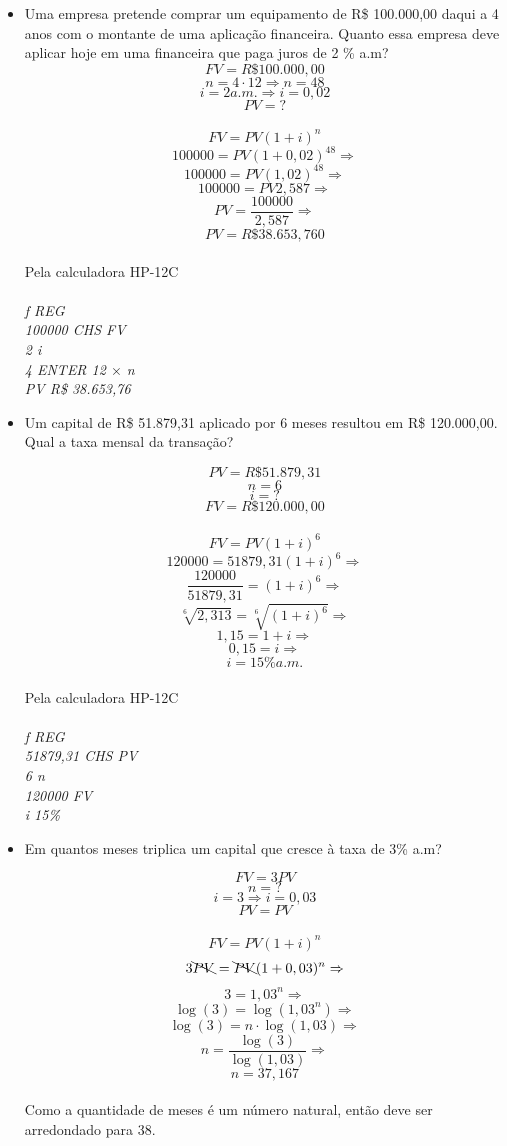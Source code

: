 \documentclass[a4paper, 12pt]{article}
\begin{document}
\begin{itemize}

\item Uma empresa pretende comprar um equipamento de R\$ 100.000,00 daqui
a 4 anos com o montante de uma aplicação financeira. Quanto essa empresa
deve aplicar hoje em uma financeira que paga juros de 2 \% a.m?
$$ FV = R\$100.000,00 $$
$$ n = 4 \cdot 12 \Rightarrow n = 48 $$
$$ i = 2 a.m. \Rightarrow i = 0,02 $$
$$ PV = ? $$
\\
$$ FV = PV(1+i)^n $$
$$ 100000 = PV(1+0,02)^{48} \Rightarrow $$
$$ 100000 = PV(1,02)^{48}  \Rightarrow $$
$$ 100000 = PV2,587  \Rightarrow $$
$$ PV = \frac{100000}{2,587}  \Rightarrow $$
$$ \boxed{PV = R\$38.653,760} $$
\\
Pela calculadora HP-12C\\\\
\emph{f REG}\\
\emph{100000 CHS FV}\\
\emph{2 i}\\
\emph{4 ENTER 12 $ \times$ n}\\
\emph{PV R\$ 38.653,76}

\item Um  capital  de  R\$  51.879,31  aplicado  por  6  meses  resultou  em  R\$ 120.000,00. Qual a taxa mensal da transação?
  
$$ PV = R\$51.879,31 $$
$$ n = 6 $$
$$ i = ? $$
$$ FV = R\$120.000,00 $$
\\
$$ FV = PV(1+i)^6 $$
$$ 120000 = 51879,31(1+i)^6 \Rightarrow $$
$$ \frac{120000}{51879,31} = (1+i)^6 \Rightarrow $$
$$ \sqrt[6]{2,313} = \sqrt[6]{(1+i)^6} \Rightarrow $$
$$ 1,15 = 1+i \Rightarrow $$
$$ 0,15 = i \Rightarrow $$
$$ \boxed{i = 15\% a.m.} $$
\\

Pela calculadora HP-12C\\\\
\emph{f REG}\\
\emph{51879,31 CHS PV}\\
\emph{6 n}\\
\emph{120000 FV}\\
\emph{i 15\%}
  
\item Em quantos meses triplica um capital que cresce à taxa de 3\% a.m?

$$ FV = 3PV $$
$$ n = ? $$
$$ i = 3 \Rightarrow i = 0,03 $$
$$ PV = PV $$
\\
$$ FV = PV(1+i)^n $$
$$ 3 \bcancel{PV} = \bcancel{PV}(1+0,03)^{n} \Rightarrow $$
$$ 3 = 1,03^{n}  \Rightarrow $$
$$ \log(3) =  \log(1,03^{n})  \Rightarrow $$
$$ \log(3) = n \cdot \log(1,03)  \Rightarrow $$
$$ n = \frac{\log(3)}{ \log(1,03)}  \Rightarrow $$
$$ \boxed{n = 37,167} $$
\\
Como a quantidade de meses é um número natural, então deve ser arredondado para 38. \\\\


\end{itemize}
\end{document}
